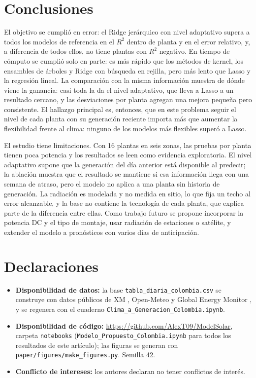 \documentclass[pdflatex,sn-mathphys-num]{sn-jnl}
\begin{document}
\section{Conclusiones}\label{sec:conclusiones}

El objetivo se cumplió en error: el Ridge jerárquico con nivel adaptativo supera a todos los modelos de referencia en el $R^2$ dentro de planta y en el error relativo, y, a diferencia de todos ellos, no tiene plantas con $R^2$ negativo. En tiempo de cómputo se cumplió solo en parte: es más rápido que los métodos de kernel, los ensambles de árboles y Ridge con búsqueda en rejilla, pero más lento que Lasso y la regresión lineal. La comparación con la misma información muestra de dónde viene la ganancia: casi toda la da el nivel adaptativo, que lleva a Lasso a un resultado cercano, y las desviaciones por planta agregan una mejora pequeña pero consistente. El hallazgo principal es, entonces, que en este problema seguir el nivel de cada planta con su generación reciente importa más que aumentar la flexibilidad frente al clima: ninguno de los modelos más flexibles superó a Lasso.

El estudio tiene limitaciones. Con 16 plantas en seis zonas, las pruebas por planta tienen poca potencia y los resultados se leen como evidencia exploratoria. El nivel adaptativo supone que la generación del día anterior está disponible al predecir; la ablación muestra que el resultado se mantiene si esa información llega con una semana de atraso, pero el modelo no aplica a una planta sin historia de generación. La radiación es modelada y no medida en sitio, lo que fija un techo al error alcanzable, y la base no contiene la tecnología de cada planta, que explica parte de la diferencia entre ellas. Como trabajo futuro se propone incorporar la potencia DC y el tipo de montaje, usar radiación de estaciones o satélite, y extender el modelo a pronósticos con varios días de anticipación.

\backmatter

\section*{Declaraciones}

\begin{itemize}
\item \textbf{Disponibilidad de datos:} la base \texttt{tabla\_diaria\_colombia.csv} se construye con datos públicos de XM \cite{xm_api}, Open-Meteo \cite{zippenfenig2023openmeteo} y Global Energy Monitor \cite{gem2026solar}, y se regenera con el cuaderno \texttt{Clima\_a\_Generacion\_Colombia.ipynb}.
\item \textbf{Disponibilidad de código:} \url{https://github.com/AlexT09/ModelSolar}, carpeta \texttt{notebooks} (\texttt{Modelo\_Propuesto\_Colombia.ipynb} para todos los resultados de este artículo); las figuras se generan con \texttt{paper/figures/make\_figures.py}. Semilla 42.
\item \textbf{Conflicto de intereses:} los autores declaran no tener conflictos de interés.
\end{itemize}


\end{document}
